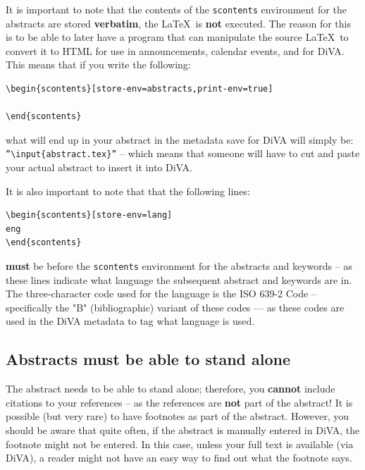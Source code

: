 \documentclass[examplethesis.tex]{subfiles}
\begin{document}
It is important to note that the contents of the \texttt{scontents} environment for the abstracts are stored \textbf{verbatim}, \ie the \LaTeX\  is \textbf{not} executed. The reason for this is to be able to later have a program that can manipulate the source \LaTeX\  to convert it to HTML for use in announcements, calendar events, and for DiVA. This means that if you write the following:
\begin{lstlisting}[style=latexExampleForAuthors]
\begin{scontents}[store-env=abstracts,print-env=true]

\end{scontents}
\end{lstlisting}
\noindent what will end up in your abstract in the metadata save for DiVA will simply be: \texttt{''\textbackslash input\{abstract.tex\}''} -- which means that someone will have to cut and paste your actual abstract to insert it into DiVA.

It is also important to note that that the following lines:
\begin{lstlisting}[style=latexExampleForAuthors]
\begin{scontents}[store-env=lang]
eng
\end{scontents}
\end{lstlisting}
\noindent \textbf{must} be before the \texttt{scontents} environment for the abstracts and keywords -- as these lines indicate what language the subsequent abstract and keywords are in. The three-character code used for the language is the ISO 639-2 Code – specifically the "B" (bibliographic) variant of these codes --- as these codes are used in the DiVA metadata to tag what language is used.

\subsection{Abstracts must be able to stand alone}
\label{sec:standaloneAbstract}

The abstract needs to be able to stand alone; therefore, you \textbf{cannot} include citations to your references -- as the references are \textbf{not} part of the abstract! It is possible (but very rare) to have footnotes as part of the abstract. However, you should be aware that quite often, if the abstract is manually entered in DiVA, the footnote might not be entered. In this case, unless your full text is available (\eg via DiVA), a reader might not have an easy way to find out what the footnote says.
\end{document}
